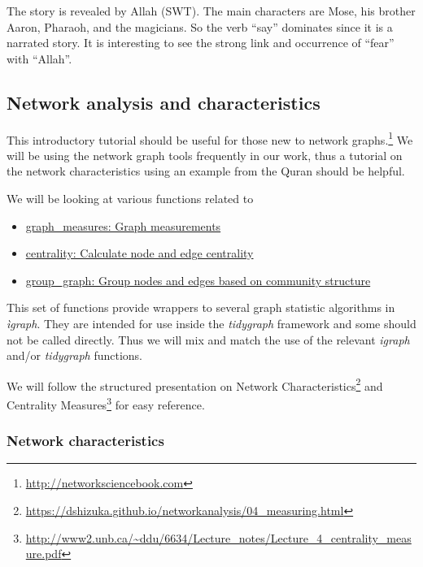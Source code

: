 \documentclass[
]{article}
\providecommand{\tightlist}{%
  \setlength{\itemsep}{0pt}\setlength{\parskip}{0pt}}
\begin{document}
The story is revealed by Allah (SWT). The main characters are Mose, his brother Aaron, Pharaoh, and the magicians. So the verb ``say'' dominates since it is a narrated story. It is interesting to see the strong link and occurrence of ``fear'' with ``Allah''.

\hypertarget{network-analysis-and-characteristics}{%
\subsection{Network analysis and characteristics}\label{network-analysis-and-characteristics}}

This introductory tutorial should be useful for those new to network graphs.\footnote{\url{http://networksciencebook.com}} We will be using the network graph tools frequently in our work, thus a tutorial on the network characteristics using an example from the Quran should be helpful.

We will be looking at various functions related to

\begin{itemize}
\tightlist
\item
  \href{https://rdrr.io/cran/tidygraph/man/graph_measures.html}{graph\_measures: Graph measurements}
\item
  \href{https://rdrr.io/cran/tidygraph/man/centrality.html}{centrality: Calculate node and edge centrality}
\item
  \href{https://rdrr.io/cran/tidygraph/man/group_graph.html}{group\_graph: Group nodes and edges based on community structure}
\end{itemize}

This set of functions provide wrappers to several graph statistic algorithms in \emph{ìgraph}. They are intended for use inside the \emph{tidygraph} framework and some should not be called directly. Thus we will mix and match the use of the relevant \emph{igraph} and/or \emph{tidygraph} functions.

We will follow the structured presentation on Network Characteristics\footnote{\url{https://dshizuka.github.io/networkanalysis/04_measuring.html}} and Centrality Measures\footnote{\url{http://www2.unb.ca/~ddu/6634/Lecture_notes/Lecture_4_centrality_measure.pdf}} for easy reference.

\hypertarget{network-characteristics}{%
\subsubsection{Network characteristics}\label{network-characteristics}}
\end{document}
